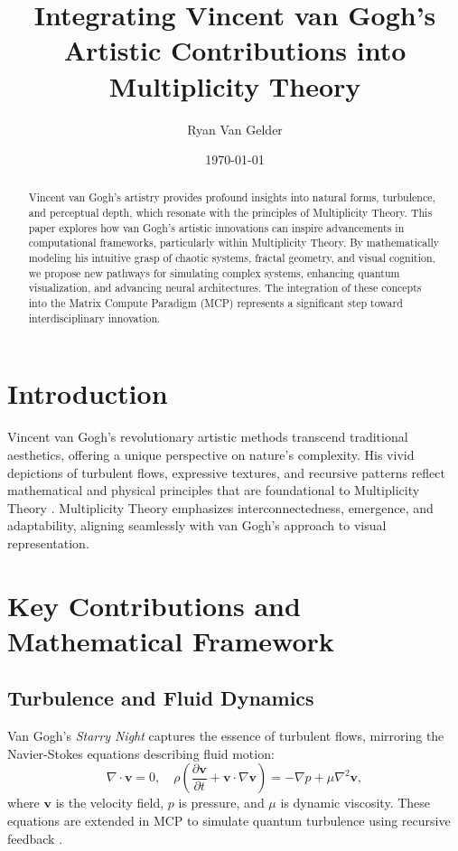 \documentclass{article}
\theoremstyle{plain}
\begin{document}
\title{Integrating Vincent van Gogh's Artistic Contributions into Multiplicity Theory}

\author{Ryan Van Gelder}
\date{\today}
\maketitle

\begin{abstract}
Vincent van Gogh's artistry provides profound insights into natural forms, turbulence, and perceptual depth, which resonate with the principles of Multiplicity Theory. This paper explores how van Gogh's artistic innovations can inspire advancements in computational frameworks, particularly within Multiplicity Theory. By mathematically modeling his intuitive grasp of chaotic systems, fractal geometry, and visual cognition, we propose new pathways for simulating complex systems, enhancing quantum visualization, and advancing neural architectures. The integration of these concepts into the Matrix Compute Paradigm (MCP) represents a significant step toward interdisciplinary innovation.
\end{abstract}

\section{Introduction}
Vincent van Gogh's revolutionary artistic methods transcend traditional aesthetics, offering a unique perspective on nature's complexity. His vivid depictions of turbulent flows, expressive textures, and recursive patterns reflect mathematical and physical principles that are foundational to Multiplicity Theory \cite{vanGogh2024}. Multiplicity Theory emphasizes interconnectedness, emergence, and adaptability, aligning seamlessly with van Gogh's approach to visual representation.

\section{Key Contributions and Mathematical Framework}

\subsection{Turbulence and Fluid Dynamics}
Van Gogh's \textit{Starry Night} captures the essence of turbulent flows, mirroring the Navier-Stokes equations describing fluid motion:
\begin{equation}
\nabla \cdot \mathbf{v} = 0, \quad \rho \left(\frac{\partial \mathbf{v}}{\partial t} + \mathbf{v} \cdot \nabla \mathbf{v}\right) = -\nabla p + \mu \nabla^2 \mathbf{v},
\end{equation}
where $\mathbf{v}$ is the velocity field, $p$ is pressure, and $\mu$ is dynamic viscosity. These equations are extended in MCP to simulate quantum turbulence using recursive feedback \cite{Multiplicity2024}.
\end{document}
